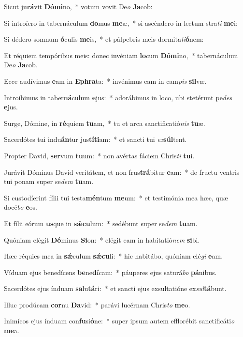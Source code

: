 \item Sicut ju\textbf{rá}vit \textbf{Dó}\textbf{mi}no,~* votum vovit De\textit{o} \textbf{Ja}cob:
\item Si introíero in tabernáculum \textbf{do}mus \textbf{me}æ,~* si ascéndero in lectum stra\textit{ti} \textbf{me}i:
\item Si dédero somnum \textbf{ó}culis \textbf{me}is,~* et pálpebris meis dormita\textit{ti}\textbf{ó}nem:
\item Et réquiem tempóribus meis: donec invéniam \textbf{lo}cum \textbf{Dó}\textbf{mi}no,~* tabernáculum De\textit{o} \textbf{Ja}cob.
\item Ecce audívimus \textbf{e}am in \textbf{E}\textbf{phra}ta:~* invénimus eam in cam\textit{pis} \textbf{sil}væ.
\item Introíbimus in taber\textbf{ná}culum \textbf{e}jus:~* adorábimus in loco, ubi stetérunt pe\textit{des} \textbf{e}jus.
\item Surge, Dómine, in \textbf{ré}quiem \textbf{tu}am,~* tu et arca sanctificatió\textit{nis} \textbf{tu}æ.
\item Sacerdótes tui indu\textbf{án}tur jus\textbf{tí}\textbf{ti}am:~* et sancti tui \textit{ex}\textbf{súl}tent.
\item Propter David, \textbf{ser}vum \textbf{tu}um:~* non avértas fáciem Chris\textit{ti} \textbf{tu}i.
\item Jurávit Dóminus David veritátem, et non frus\textbf{trá}bitur \textbf{e}am:~* de fructu ventris tui ponam super se\textit{dem} \textbf{tu}am.
\item Si custodíerint fílii tui testa\textbf{mén}tum \textbf{me}um:~* et testimónia mea hæc, quæ docé\textit{bo} \textbf{e}os.
\item Et fílii eórum \textbf{us}que in \textbf{sǽ}\textbf{cu}lum:~* sedébunt super se\textit{dem} \textbf{tu}am.
\item Quóniam elégit \textbf{Dó}minus \textbf{Si}on:~* elégit eam in habitatió\textit{nem} \textbf{si}bi.
\item Hæc réquies mea in \textbf{sǽ}culum \textbf{sǽ}\textbf{cu}li:~* hic habitábo, quóniam elé\textit{gi} \textbf{e}am.
\item Víduam ejus benedícens \textbf{be}ne\textbf{dí}cam:~* páuperes ejus saturá\textit{bo} \textbf{pá}nibus.
\item Sacerdótes ejus índuam \textbf{sa}lu\textbf{tá}ri:~* et sancti ejus exsultatióne ex\textit{sul}\textbf{tá}bunt.
\item Illuc prodúcam \textbf{cor}nu \textbf{Da}vid:~* parávi lucérnam Chris\textit{to} \textbf{me}o.
\item Inimícos ejus índuam con\textbf{fu}si\textbf{ó}ne:~* super ipsum autem efflorébit sanctificáti\textit{o} \textbf{me}a.
